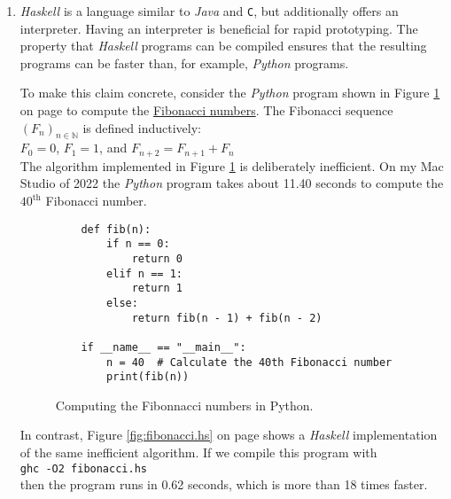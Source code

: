 \begin{enumerate}
\item \textsl{Haskell} is a  language similar to \textsl{Java} and \texttt{C}, but additionally
  offers an interpreter.  Having an interpreter is beneficial for rapid prototyping.  The property that
  \textsl{Haskell} programs can be compiled ensures that the resulting programs can be faster than,
  for example, \textsl{Python} programs.

  To make this claim concrete, consider the \textsl{Python} program shown in Figure \ref{fig:fibonacci.py} on
  page \pageref{fig:fibonacci.py} to compute the
  \href{https://en.wikipedia.org/wiki/Fibonacci_numbers}{Fibonacci numbers}.  The Fibonacci sequence
  $(F_n)_{n\in\mathbb{N}}$ is defined inductively:
  \\[0.2cm]
  \hspace*{1.3cm}
  $F_0 = 0$, $F_1 = 1$, and $F_{n+2} = F_{n+1}  + F_n$
  \\[0.2cm]
  The algorithm implemented in Figure \ref{fig:fibonacci.py} is 
  deliberately inefficient.  On my Mac Studio of 2022 the \textsl{Python} program takes about 11.40 seconds to
  compute the $40^{\mathrm{th}}$ Fibonacci number.

\begin{figure}[!ht]
\centering
\begin{verbatim}
    def fib(n):
        if n == 0:
            return 0
        elif n == 1:
            return 1
        else:
            return fib(n - 1) + fib(n - 2)
    
    if __name__ == "__main__":
        n = 40  # Calculate the 40th Fibonacci number
        print(fib(n))
\end{verbatim}
\vspace*{-0.3cm}
\caption{Computing the Fibonnacci numbers in Python.}
\label{fig:fibonacci.py}
\end{figure}

    In contrast, Figure \ref{fig:fibonacci.hs} on page \pageref{fig:fibonacci.hs} shows a \textsl{Haskell}
    implementation of the same inefficient algorithm.  If we compile this program with
    \\[0.2cm]
    \hspace*{1.3cm}
    \texttt{ghc -O2 fibonacci.hs}
    \\[0.2cm]
    then the program runs in 0.62 seconds, which is more than 18 times faster.


\end{enumerate}
